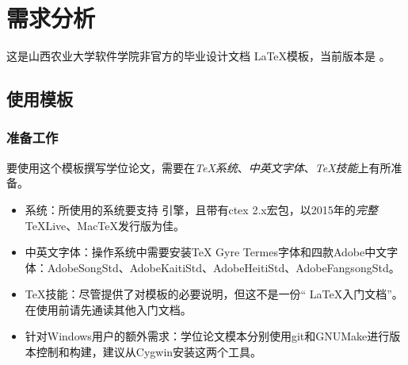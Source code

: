 \chapter{需求分析}
\label{chap:intro}

这是山西农业大学软件学院非官方的毕业设计文档 \LaTeX 模板，当前版本是 \version 。

\section{使用模板}

\subsection{准备工作}
\label{sec:requirements}

要使用这个模板撰写学位论文，需要在\emph{TeX系统}、\emph{中英文字体}、\emph{TeX技能}上有所准备。

\begin{itemize}[noitemsep,topsep=0pt,parsep=0pt,partopsep=0pt]
	\item 系统：所使用的系统要支持 引擎，且带有ctex 2.x宏包，以2015年的\emph{完整}TeXLive、MacTeX发行版为佳。
	\item 中英文字体：操作系统中需要安装TeX Gyre Termes字体和四款Adobe中文字体：AdobeSongStd、AdobeKaitiStd、AdobeHeitiStd、AdobeFangsongStd。
	\item TeX技能：尽管提供了对模板的必要说明，但这不是一份“ \LaTeX 入门文档”。在使用前请先通读其他入门文档。
	\item 针对Windows用户的额外需求：学位论文模本分别使用git和GNUMake进行版本控制和构建，建议从Cygwin安装这两个工具。
\end{itemize}